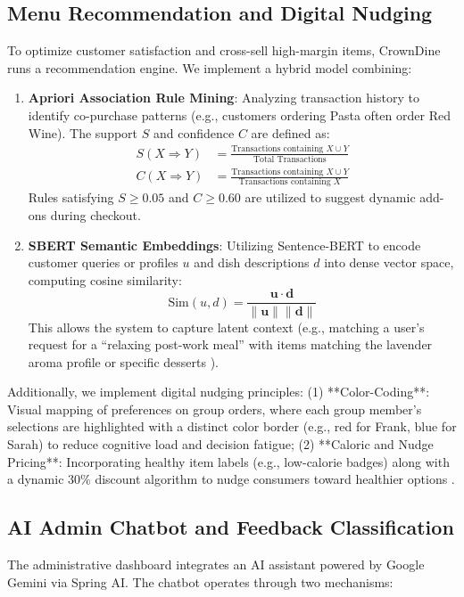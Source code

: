 \documentclass[pdflatex,sn-mathphys-num]{sn-jnl}%
\theoremstyle{thmstyleone}%
\theoremstyle{thmstyletwo}%
\theoremstyle{thmstylethree}%
\begin{document}
\subsection{Menu Recommendation and Digital Nudging}
To optimize customer satisfaction and cross-sell high-margin items, CrownDine runs a recommendation engine. We implement a hybrid model combining:

\begin{enumerate}
    \item \textbf{Apriori Association Rule Mining}: Analyzing transaction history to identify co-purchase patterns (e.g., customers ordering Pasta often order Red Wine). The support $S$ and confidence $C$ are defined as:
    \begin{align}
    S(X \Rightarrow Y) &= \frac{\text{Transactions containing } X \cup Y}{\text{Total Transactions}} \\
    C(X \Rightarrow Y) &= \frac{\text{Transactions containing } X \cup Y}{\text{Transactions containing } X}
    \end{align}
    Rules satisfying $S \ge 0.05$ and $C \ge 0.60$ are utilized to suggest dynamic add-ons during checkout.

    \item \textbf{SBERT Semantic Embeddings}: Utilizing Sentence-BERT to encode customer queries or profiles $u$ and dish descriptions $d$ into dense vector space, computing cosine similarity:
    \begin{equation}
    \text{Sim}(u, d) = \frac{\mathbf{u} \cdot \mathbf{d}}{\|\mathbf{u}\| \|\mathbf{d}\|}
    \end{equation}
    This allows the system to capture latent context (e.g., matching a user's request for a ``relaxing post-work meal'' with items matching the lavender aroma profile or specific desserts \cite{art13}).
\end{enumerate}

Additionally, we implement digital nudging principles: (1) **Color-Coding**: Visual mapping of preferences on group orders, where each group member's selections are highlighted with a distinct color border (e.g., red for Frank, blue for Sarah) to reduce cognitive load and decision fatigue; (2) **Caloric and Nudge Pricing**: Incorporating healthy item labels (e.g., low-calorie badges) along with a dynamic 30\% discount algorithm to nudge consumers toward healthier options \cite{art18}.

\subsection{AI Admin Chatbot and Feedback Classification}
The administrative dashboard integrates an AI assistant powered by Google Gemini via Spring AI. The chatbot operates through two mechanisms:
\end{document}
